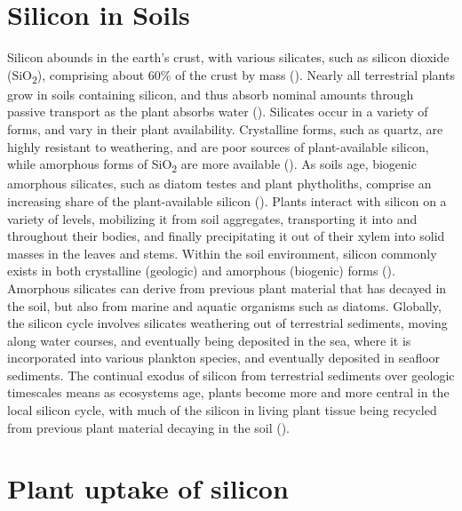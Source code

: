 \documentclass[12pt, letterpaper, ]{report}
\begin{document}
\section{Silicon in Soils}

Silicon abounds in the earth’s crust, with various silicates, such as silicon dioxide (SiO\textsubscript{2}), comprising about 60\% of the crust by mass (\cite{holland_41_2014}). Nearly all terrestrial plants grow in soils containing silicon, and thus absorb nominal amounts through passive transport as the plant absorbs water (\cite{debona_silicons_2017}). Silicates occur in a variety of forms, and vary in their plant availability. Crystalline forms, such as quartz, are highly resistant to weathering, and are poor sources of plant-available silicon, while amorphous forms of SiO\textsubscript{2} are more available (\cite{fraysse_surface_2009}). As soils age, biogenic amorphous silicates, such as diatom testes and plant phytholiths, comprise an increasing share of the plant-available silicon (\cite{de_tombeur_plants_2020}). 
Plants interact with silicon on a variety of levels, mobilizing it from soil aggregates, transporting it into and throughout their bodies, and finally precipitating it out of their xylem into solid masses in the leaves and stems. Within the soil environment, silicon commonly exists in both crystalline (geologic) and amorphous (biogenic) forms (\cite{haynes_contemporary_2014}). Amorphous silicates can derive from previous plant material that has decayed in the soil, but also from marine and aquatic organisms such as diatoms. Globally, the silicon cycle involves silicates weathering out of terrestrial sediments, moving along water courses, and eventually being deposited in the sea, where it is incorporated into various plankton species, and eventually deposited in seafloor sediments. The continual exodus of silicon from terrestrial sediments over geologic timescales means as ecosystems age, plants become more and more central in the local silicon cycle, with much of the silicon in living plant tissue being recycled from previous plant material decaying in the soil (\cite{de_tombeur_plants_2020}).  

\section{Plant uptake of silicon}
\end{document}
